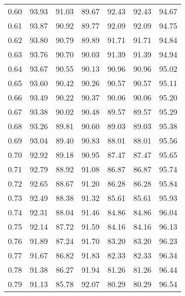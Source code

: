 \begin{tabular}{|c|c|c|c|c|c|c|}
      0.60 &     93.93 &     91.03 &      89.67 &   92.43 &      92.43 &         94.67 \\
      0.61 &     93.87 &     90.92 &      89.77 &   92.09 &      92.09 &         94.75 \\
      0.62 &     93.80 &     90.79 &      89.89 &   91.71 &      91.71 &         94.84 \\
      0.63 &     93.76 &     90.70 &      90.03 &   91.39 &      91.39 &         94.94 \\
      0.64 &     93.67 &     90.55 &      90.13 &   90.96 &      90.96 &         95.02 \\
      0.65 &     93.60 &     90.42 &      90.26 &   90.57 &      90.57 &         95.11 \\
      0.66 &     93.49 &     90.22 &      90.37 &   90.06 &      90.06 &         95.20 \\
      0.67 &     93.38 &     90.02 &      90.48 &   89.57 &      89.57 &         95.29 \\
      0.68 &     93.26 &     89.81 &      90.60 &   89.03 &      89.03 &         95.38 \\
      0.69 &     93.04 &     89.40 &      90.83 &   88.01 &      88.01 &         95.56 \\
      0.70 &     92.92 &     89.18 &      90.95 &   87.47 &      87.47 &         95.65 \\
      0.71 &     92.79 &     88.92 &      91.08 &   86.87 &      86.87 &         95.74 \\
      0.72 &     92.65 &     88.67 &      91.20 &   86.28 &      86.28 &         95.84 \\
      0.73 &     92.49 &     88.38 &      91.32 &   85.61 &      85.61 &         95.93 \\
      0.74 &     92.31 &     88.04 &      91.46 &   84.86 &      84.86 &         96.04 \\
      0.75 &     92.14 &     87.72 &      91.59 &   84.16 &      84.16 &         96.13 \\
      0.76 &     91.89 &     87.24 &      91.70 &   83.20 &      83.20 &         96.23 \\
      0.77 &     91.67 &     86.82 &      91.83 &   82.33 &      82.33 &         96.34 \\
      0.78 &     91.38 &     86.27 &      91.94 &   81.26 &      81.26 &         96.44 \\
      0.79 &     91.13 &     85.78 &      92.07 &   80.29 &      80.29 &         96.54 \\

\end{tabular}
